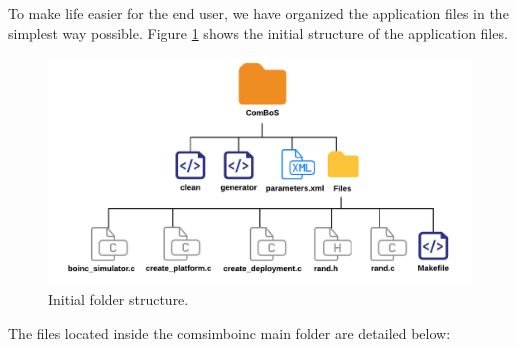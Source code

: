 To make life easier for the end user, we have organized the application files in the simplest way possible. Figure \ref{fig:folder_structure} shows the initial structure of the application files.

\begin{figure}[htbp]
 	\centering
 	\includegraphics[width=15.5cm]{figures/folder_structure}
 	\caption{Initial folder structure.}
	\label{fig:folder_structure}
\end{figure}

The files located inside the \gls{comsimboinc} main folder are detailed below:

